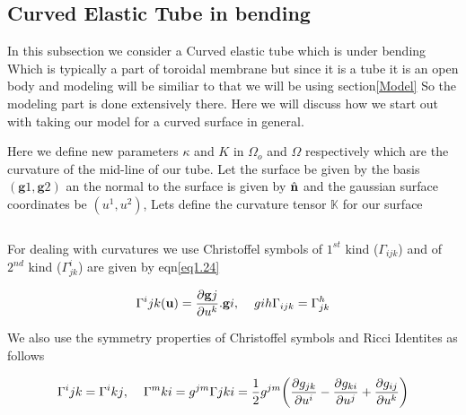 \documentclass[12pt]{report}
\begin{document}
\pagebreak

\subsection{Curved Elastic Tube in bending}\label{tube}
In this subsection we consider a Curved elastic tube which is under bending Which is typically a part of toroidal membrane but since it is a tube it is an open body and modeling will be similiar to that we will be using section\ref{Model} So the modeling part is done extensively there. Here we will discuss how we start out with taking our model for a curved surface in general.

Here we define new parameters $\kappa$ and $K$ in $\Omega_{o}$ and $\Omega$ respectively which are the curvature of the mid-line of our tube. Let the surface be given by the basis$({\textbf{g}}{1},{\textbf{g}}{2})$ an the normal to the surface is given by $\hat{\bf{n}}$ and the gaussian surface coordinates be $(u^{1},u^{2})$, Lets define the curvature tensor $\mathds{{K}}$  for our surface

\begin{equation}\label{eq1.23}
\end{equation}

\begin{flushleft}

For dealing with curvatures we use Christoffel symbols of $1^{st}$ kind ($\Gamma_{ijk}$) and of $2^{nd}$ kind ($\Gamma^{i}_{jk}$) are given by eqn\ref{eq1.24}

\begin{equation}\label{eq1.24}
    \Gamma^{i}{jk}({\bf{u}}) = \frac{\partial {\bf{g}}{j}}{\partial u^{k}}.{\bf{g}}{i},\hspace{4mm}g{ih}\Gamma_{ijk}=\Gamma^{h}_{jk}
\end{equation}

We also use the symmetry properties of Christoffel symbols and Ricci Identites as follows

\begin{equation}\label{eq1.25}
    \Gamma^{i}{jk}=\Gamma^{i}{kj},\hspace{4mm}\Gamma^{m}{ki} = g^{jm}\Gamma{jki} = \frac{1}{2}g^{jm}\bigg(\frac{\partial g_{jk}}{\partial u^{i}}-\frac{\partial g_{ki}}{\partial u^{j}}+\frac{\partial g_{ij}}{\partial u^{k}}\bigg)
\end{equation}
\end{flushleft}
\end{document}
